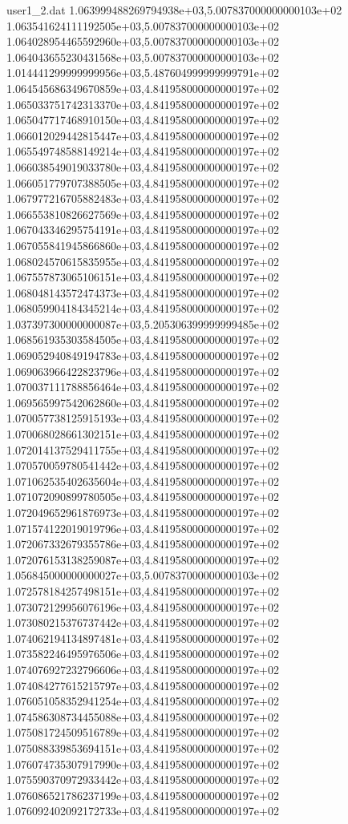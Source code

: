 \begin{filecontents}{user1_2.dat}
1.063999488269794938e+03,5.007837000000000103e+02
1.063541624111192505e+03,5.007837000000000103e+02
1.064028954465592960e+03,5.007837000000000103e+02
1.064043655230431568e+03,5.007837000000000103e+02
1.014441299999999956e+03,5.487604999999999791e+02
1.064545686349670859e+03,4.841958000000000197e+02
1.065033751742313370e+03,4.841958000000000197e+02
1.065047717468910150e+03,4.841958000000000197e+02
1.066012029442815447e+03,4.841958000000000197e+02
1.065549748588149214e+03,4.841958000000000197e+02
1.066038549019033780e+03,4.841958000000000197e+02
1.066051779707388505e+03,4.841958000000000197e+02
1.067977216705882483e+03,4.841958000000000197e+02
1.066553810826627569e+03,4.841958000000000197e+02
1.067043346295754191e+03,4.841958000000000197e+02
1.067055841945866860e+03,4.841958000000000197e+02
1.068024570615835955e+03,4.841958000000000197e+02
1.067557873065106151e+03,4.841958000000000197e+02
1.068048143572474373e+03,4.841958000000000197e+02
1.068059904184345214e+03,4.841958000000000197e+02
1.037397300000000087e+03,5.205306399999999485e+02
1.068561935303584505e+03,4.841958000000000197e+02
1.069052940849194783e+03,4.841958000000000197e+02
1.069063966422823796e+03,4.841958000000000197e+02
1.070037111788856464e+03,4.841958000000000197e+02
1.069565997542062860e+03,4.841958000000000197e+02
1.070057738125915193e+03,4.841958000000000197e+02
1.070068028661302151e+03,4.841958000000000197e+02
1.072014137529411755e+03,4.841958000000000197e+02
1.070570059780541442e+03,4.841958000000000197e+02
1.071062535402635604e+03,4.841958000000000197e+02
1.071072090899780505e+03,4.841958000000000197e+02
1.072049652961876973e+03,4.841958000000000197e+02
1.071574122019019796e+03,4.841958000000000197e+02
1.072067332679355786e+03,4.841958000000000197e+02
1.072076153138259087e+03,4.841958000000000197e+02
1.056845000000000027e+03,5.007837000000000103e+02
1.072578184257498151e+03,4.841958000000000197e+02
1.073072129956076196e+03,4.841958000000000197e+02
1.073080215376737442e+03,4.841958000000000197e+02
1.074062194134897481e+03,4.841958000000000197e+02
1.073582246495976506e+03,4.841958000000000197e+02
1.074076927232796606e+03,4.841958000000000197e+02
1.074084277615215797e+03,4.841958000000000197e+02
1.076051058352941254e+03,4.841958000000000197e+02
1.074586308734455088e+03,4.841958000000000197e+02
1.075081724509516789e+03,4.841958000000000197e+02
1.075088339853694151e+03,4.841958000000000197e+02
1.076074735307917990e+03,4.841958000000000197e+02
1.075590370972933442e+03,4.841958000000000197e+02
1.076086521786237199e+03,4.841958000000000197e+02
1.076092402092172733e+03,4.841958000000000197e+02

\end{filecontents}
